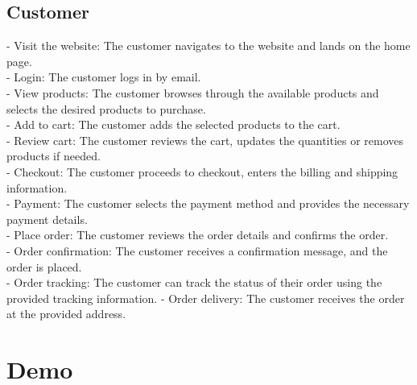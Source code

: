 \subsection{Customer}
- Visit the website: The customer navigates to the website and lands on the home page.\\
- Login: The customer logs in by email.\\
- View products: The customer browses through the available products and selects the desired products to purchase.\\
- Add to cart: The customer adds the selected products to the cart.\\
- Review cart: The customer reviews the cart, updates the quantities or removes products if needed.\\
- Checkout: The customer proceeds to checkout, enters the billing and shipping information.\\
- Payment: The customer selects the payment method and provides the necessary payment details.\\
- Place order: The customer reviews the order details and confirms the order.\\
- Order confirmation: The customer receives a confirmation message, and the order is placed.\\
- Order tracking: The customer can track the status of their order using the provided tracking information.
- Order delivery: The customer receives the order at the provided address.
\section{Demo}
